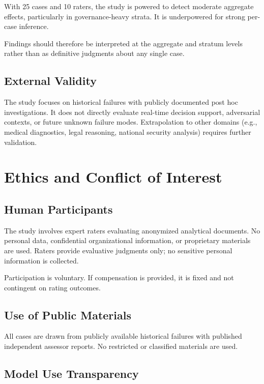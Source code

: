 With 25 cases and 10 raters, the study is powered to detect moderate aggregate effects, particularly in governance-heavy strata. It is underpowered for strong per-case inference. 

Findings should therefore be interpreted at the aggregate and stratum levels rather than as definitive judgments about any single case.

\subsection{External Validity}

The study focuses on historical failures with publicly documented post hoc investigations. It does not directly evaluate real-time decision support, adversarial contexts, or future unknown failure modes. Extrapolation to other domains (e.g., medical diagnostics, legal reasoning, national security analysis) requires further validation.

\section{Ethics and Conflict of Interest}
\label{sec:ethics}

\subsection{Human Participants}

The study involves expert raters evaluating anonymized analytical documents. No personal data, confidential organizational information, or proprietary materials are used. Raters provide evaluative judgments only; no sensitive personal information is collected.

Participation is voluntary. If compensation is provided, it is fixed and not contingent on rating outcomes.

\subsection{Use of Public Materials}

All cases are drawn from publicly available historical failures with published independent assessor reports. No restricted or classified materials are used.

\subsection{Model Use Transparency}

